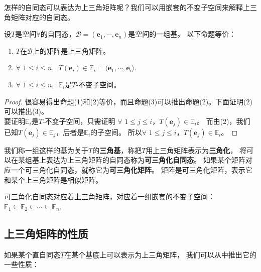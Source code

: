 \documentclass[12pt,UTF8]{ctexbook}
\begin{document}
怎样的自同态可以表达为上三角矩阵呢？我们可以用嵌套的不变子空间来解释上三角矩阵对应的自同态。
\begin{pp}\label{pp:6_5}
    设$T$是空间$\mathbb{V}$的自同态，$\mathcal{B} = (\mathbf{e}_1, \cdots , \mathbf{e}_n)$是空间的一组基。
    以下命题等价：
    \begin{enumerate}
        \item $T$在$\mathcal{B}$上的矩阵是上三角矩阵。
        \item $\forall \,\, 1 \leqslant i \leqslant n, \,\,\, T(\mathbf{e}_i) \in \mathbb{E}_i = \langle \mathbf{e}_1, \cdots , \mathbf{e}_i\rangle .$
        \item $\forall \,\, 1 \leqslant i \leqslant n, \,\,\, \mathbb{E}_i $是$T$-不变子空间。
    \end{enumerate}
\end{pp}
\begin{proof} %
    很容易得出命题(1)和(2)等价，而且命题(3)可以推出命题(2)。下面证明(2)可以推出(3)。\\
    要证明$\mathbb{E}_i $是$T$-不变子空间，只需证明
    $\forall \,\, 1 \leqslant j \leqslant i$，$T(\mathbf{e}_j) \in \mathbb{E}_i$。
    而由(2)，我们已知$T(\mathbf{e}_j) \in \mathbb{E}_j$，后者是$\mathbb{E}_i$的子空间。
    所以$\forall \,\, 1 \leqslant j \leqslant i$，$T(\mathbf{e}_j) \in \mathbb{E}_i$。
    
\end{proof}


我们称一组这样的基为关于$T$的\textbf{三角基}，称把$T$用上三角矩阵表示为\textbf{三角化}，
将可以在某组基上表达为上三角矩阵的自同态称为\textbf{可三角化自同态}。
如果某个矩阵对应一个可三角化自同态，就称它为\textbf{可三角化矩阵}。
矩阵是可三角化矩阵，表示它和某个上三角矩阵是相似矩阵。

可三角化自同态对应着上三角矩阵，对应着一组嵌套的不变子空间：$\mathbb{E}_1 \subseteq \mathbb{E}_2 \subseteq \cdots \subseteq \mathbb{E}_n$.

\subsection{上三角矩阵的性质}
如果某个直自同态$T$在某个基底上可以表示为上三角矩阵，
我们可以从中推出它的一些性质：
\end{document}
